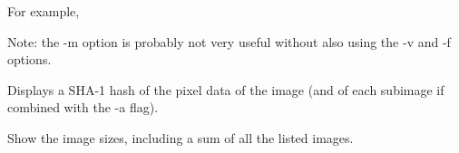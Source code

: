 For example,
\apiend

Note: the {\cf -m} option is probably not very useful without also using
the {\cf -v} and {\cf -f} options.

Displays a SHA-1 hash of the pixel data of the image (and of each
subimage if combined with the {\cf -a} flag).
\apiend

Show the image sizes, including a sum of all the listed images.
\apiend

